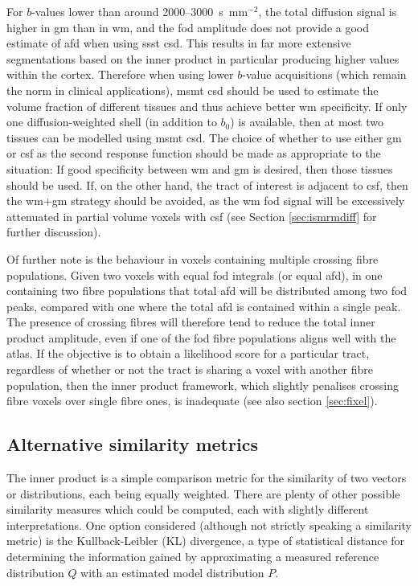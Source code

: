 For $b$-values lower than around 2000--3000~s~mm$^{-2}$, the total diffusion signal is higher in \gls{gm} than in \gls{wm}, and the \gls{fod} amplitude does not provide a good estimate of \gls{afd} when using \gls{ssst} \gls{csd}.
This results in far more extensive segmentations based on the inner product in particular producing higher values within the cortex.
Therefore when using lower $b$-value acquisitions (which remain the norm in clinical applications), \gls{msmt} \gls{csd} should be used to estimate the volume fraction of different tissues and thus achieve better \gls{wm} specificity.
If only one diffusion-weighted shell (in addition to $b_0$) is available, then at most two tissues can be modelled using \gls{msmt} \gls{csd}.
The choice of whether to use either \gls{gm} or \gls{csf} as the second response function should be made as appropriate to the situation: If good specificity between \gls{wm} and \gls{gm} is desired, then those tissues should be used.
If, on the other hand, the tract of interest is adjacent to \gls{csf}, then the \gls{wm}+\gls{gm} strategy should be avoided, as the \gls{wm} \gls{fod} signal will be excessively attenuated in partial volume voxels with \gls{csf} (see Section \ref{sec:ismrmdiff} for further discussion).

Of further note is the behaviour in voxels containing multiple crossing fibre populations.
Given two voxels with equal \gls{fod} integrals (or equal \gls{afd}), in one containing two fibre populations that total \gls{afd} will be distributed among two \gls{fod} peaks, compared with one where the total \gls{afd} is contained within a single peak.
The presence of crossing fibres will therefore tend to reduce the total inner product amplitude, even if one of the \gls{fod} fibre populations aligns well with the atlas.
If the objective is to obtain a likelihood score for a particular tract, regardless of whether or not the tract is sharing a voxel with another fibre population, then the inner product framework, which slightly penalises crossing fibre voxels over single fibre ones, is inadequate (see also section \ref{sec:fixel}). %

\subsection{Alternative similarity metrics}

The inner product is a simple comparison metric for the similarity of two vectors or distributions, each being equally weighted.
There are plenty of other possible similarity measures which could be computed, each with slightly different interpretations.
One option considered (although not strictly speaking a similarity metric) is the Kullback-Leibler (KL) divergence, a type of statistical distance for determining the information gained by approximating a measured reference distribution $Q$ with an estimated model distribution $P$.

